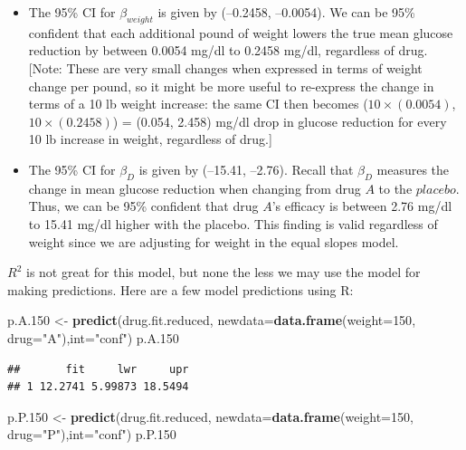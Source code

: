 \documentclass[
]{book}
\newenvironment{Shaded}{\begin{snugshade}}{\end{snugshade}}
\newcommand{\AttributeTok}[1]{\textcolor[rgb]{0.13,0.29,0.53}{#1}}
\newcommand{\DecValTok}[1]{\textcolor[rgb]{0.00,0.00,0.81}{#1}}
\newcommand{\FloatTok}[1]{\textcolor[rgb]{0.00,0.00,0.81}{#1}}
\newcommand{\FunctionTok}[1]{\textcolor[rgb]{0.13,0.29,0.53}{\textbf{#1}}}
\newcommand{\NormalTok}[1]{#1}
\newcommand{\OtherTok}[1]{\textcolor[rgb]{0.56,0.35,0.01}{#1}}
\newcommand{\StringTok}[1]{\textcolor[rgb]{0.31,0.60,0.02}{#1}}
\providecommand{\tightlist}{%
  \setlength{\itemsep}{0pt}\setlength{\parskip}{0pt}}
\begin{document}
\begin{itemize}
\tightlist
\item
  The 95\% CI for \(\beta_{weight}\) is given by (--0.2458, --0.0054). We can be 95\% confident that each additional pound of weight lowers the true mean glucose reduction by between 0.0054 mg/dl to 0.2458 mg/dl, regardless of drug. {[}Note: These are very small changes when expressed in terms of weight change per pound, so it might be more useful to re-express the change in terms of a 10 lb weight increase: the same CI then becomes (\(10\times(0.0054)\), \(10\times(0.2458)\)) = (0.054, 2.458) mg/dl drop in glucose reduction for every 10 lb increase in weight, regardless of drug.{]}
\item
  The 95\% CI for \(\beta_D\) is given by (--15.41, --2.76). Recall that \(\beta_D\) measures the change in mean glucose reduction when changing from drug \(A\) to the \(placebo\). Thus, we can be 95\% confident that drug \(A\)'s efficacy is between 2.76 mg/dl to 15.41 mg/dl higher with the placebo. This finding is valid regardless of weight since we are adjusting for weight in the equal slopes model.
\end{itemize}

\(R^2\) is not great for this model, but none the less we may use the model for making predictions. Here are a few model predictions using R:

\begin{Shaded}
\begin{Highlighting}[]
\NormalTok{p.A}\FloatTok{.150} \OtherTok{\textless{}{-}} \FunctionTok{predict}\NormalTok{(drug.fit.reduced, }\AttributeTok{newdata=}\FunctionTok{data.frame}\NormalTok{(}\AttributeTok{weight=}\DecValTok{150}\NormalTok{, }\AttributeTok{drug=}\StringTok{"A"}\NormalTok{),}\AttributeTok{int=}\StringTok{"conf"}\NormalTok{)}
\NormalTok{p.A}\FloatTok{.150}
\end{Highlighting}
\end{Shaded}

\begin{verbatim}
##       fit     lwr     upr
## 1 12.2741 5.99873 18.5494
\end{verbatim}

\begin{Shaded}
\begin{Highlighting}[]
\NormalTok{p.P}\FloatTok{.150} \OtherTok{\textless{}{-}} \FunctionTok{predict}\NormalTok{(drug.fit.reduced, }\AttributeTok{newdata=}\FunctionTok{data.frame}\NormalTok{(}\AttributeTok{weight=}\DecValTok{150}\NormalTok{, }\AttributeTok{drug=}\StringTok{"P"}\NormalTok{),}\AttributeTok{int=}\StringTok{"conf"}\NormalTok{)}
\NormalTok{p.P}\FloatTok{.150}
\end{Highlighting}
\end{Shaded}
\end{document}

